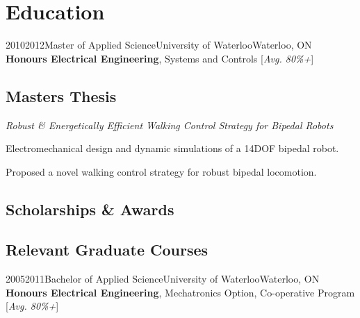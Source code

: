 \section{Education}

\vspace{2 mm}
\tlcventry
{2010}{2012}{Master of Applied Science}{University of Waterloo}{Waterloo, ON}{}
{\textbf{Honours Electrical Engineering}, Systems and Controls [\emph{Avg. 80\%+}]}

\subsection{Masters Thesis} %
	{\emph{Robust \& Energetically Efficient Walking Control Strategy for Bipedal Robots}
	\begin{tightitemize}
		\item Electromechanical design and dynamic simulations of a 14DOF bipedal robot.
		\item Proposed a novel walking control strategy for robust bipedal locomotion.
	\end{tightitemize}}
	\vspace{-6 mm}
\subsection{Scholarships \& Awards} %
\subsection{Relevant Graduate Courses} %

\vspace{5 mm}
\tlcventry
{2005}{2011}{Bachelor of Applied Science}{University of Waterloo}{Waterloo, ON}{}
{\textbf{Honours Electrical Engineering}, Mechatronics Option, Co-operative Program
 [\emph{Avg. 80\%+}]}

